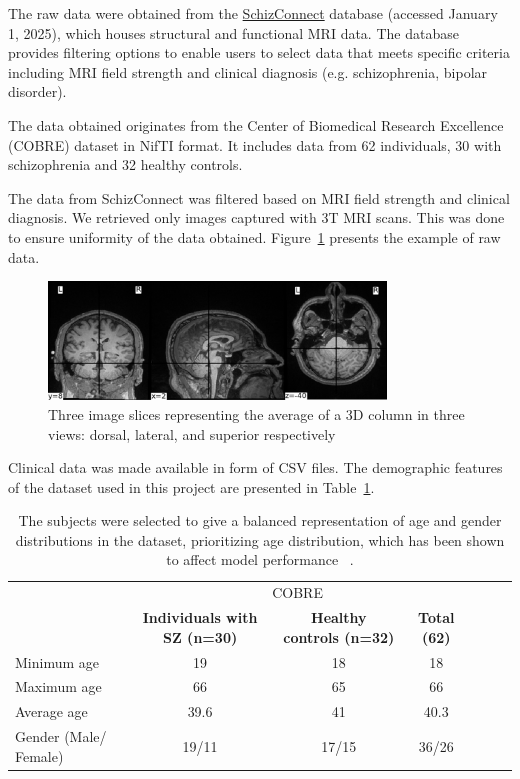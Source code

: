 The raw data were obtained from the \href{http://schizconnect.org}{SchizConnect} database (accessed January 1, 2025), which houses structural and functional MRI data. The database provides filtering options to enable users to select data that meets specific criteria including MRI field strength and clinical diagnosis (e.g. schizophrenia, bipolar disorder).

The data obtained originates from the Center of Biomedical Research Excellence (COBRE) dataset in NifTI format. It includes data from 62 individuals, 30 with schizophrenia and 32 healthy controls.

The data from SchizConnect was filtered based on MRI field strength and clinical diagnosis. We retrieved only images captured with 3T MRI scans. This was done to ensure uniformity of the data obtained. Figure~\ref{fig:raw_mri_volume_slices} presents the example of raw data.
\begin{figure}[h]
    \centering
    \includegraphics[width=0.8\textwidth]{./figs/sample_volume.png} %
    \caption{Three image slices representing the average of a 3D column in three views: dorsal, lateral, and superior respectively}\label{fig:raw_mri_volume_slices}
\end{figure}

Clinical data was made available in form of CSV files. The demographic features of the dataset used in this project are presented in Table~\ref{tab:cobre_clinical_demographic}.
\begin{center}
	\begin{table}
        \centering
        \caption{\label{tab:cobre_clinical_demographic}The subjects were selected to give a balanced representation of age and gender distributions in the dataset, prioritizing age distribution, which has been shown to affect model performance ~\cite{Oh2020}.}
        \begin{tabular*}{500pt}{@{\extracolsep\fill}lcccccc@{\extracolsep\fill}}
            \toprule
            & \multicolumn{3}{c}{COBRE}
            \\\cmidrule{2-4}
            & \textbf{Individuals with SZ (n=30)} & \textbf{Healthy controls (n=32)} & \textbf{Total (62)} \\
            \midrule
            Minimum age             & 19  & 18  & 18 \\
            Maximum age 		    & 66  & 65 & 66  \\
            Average age             & 39.6 & 41 & 40.3	\\
            Gender (Male/ Female)   & 19/11 & 17/15 & 36/26	\\
            \bottomrule
        \end{tabular*}
    \end{table}    
\end{center}


